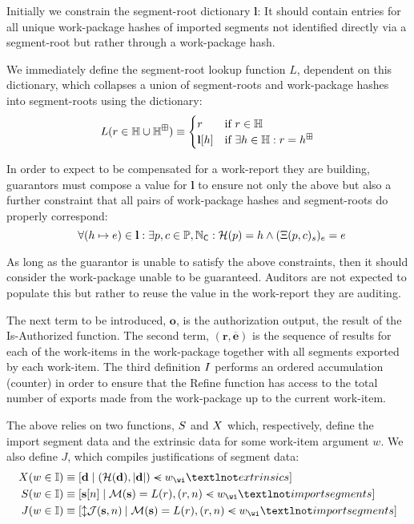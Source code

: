Initially we constrain the segment-root dictionary $\mathbf{l}$: It should contain entries for all unique work-package hashes of imported segments not identified directly via a segment-root but rather through a work-package hash.

We immediately define the segment-root lookup function $L$, dependent on this dictionary, which collapses a union of segment-roots and work-package hashes into segment-roots using the dictionary:
\begin{equation}
  L(r \in \mathbb{H}\cup\mathbb{H}^\boxplus) \equiv \begin{cases}
    r &\text{if } r \in \mathbb{H} \\
    \mathbf{l}[h] &\text{if } \exists h \in \mathbb{H}: r = h^\boxplus
  \end{cases}
\end{equation}

In order to expect to be compensated for a work-report they are building, guarantors must compose a value for $\mathbf{l}$ to ensure not only the above but also a further constraint that all pairs of work-package hashes and segment-roots do properly correspond:
\begin{equation}
  \forall (h \mapsto e) \in \mathbf{l} : \exists p, c \in \mathbb{P}, \mathbb{N}_\mathsf{C} : \mathcal{H}(p) = h \wedge (\Xi(p, c)_s)_e = e\!\!\!\!
\end{equation}

As long as the guarantor is unable to satisfy the above constraints, then it should consider the work-package unable to be guaranteed. Auditors are not expected to populate this but rather to reuse the value in the work-report they are auditing.

The next term to be introduced, $\mathbf{o}$, is the authorization output, the result of the Is-Authorized function. The second term, $(\mathbf{r}, \overline{\mathbf{e}})$ is the sequence of results for each of the work-items in the work-package together with all segments exported by each work-item. The third definition $I$ performs an ordered accumulation (\ie counter) in order to ensure that the Refine function has access to the total number of exports made from the work-package up to the current work-item.

The above relies on two functions, $S$ and $X$ which, respectively, define the import segment data and the extrinsic data for some work-item argument $w$. We also define $J$, which compiles justifications of segment data:
\begin{equation}
  \begin{aligned}
    \extrinsicdata(\wiX \in \mathbb{I}) &\equiv [\mathbf{d} \mid (\mathcal{H}(\mathbf{d}), |\mathbf{d}|) \orderedin \wiX_\wi¬extrinsics] \\
    \importsegmentdata(\wiX \in \mathbb{I}) &\equiv [\mathbf{s}[n] \mid \mathcal{M}(\mathbf{s}) = L(r), (r, n) \orderedin \wiX_\wi¬importsegments] \\
    \justifysegmentdata(\wiX \in \mathbb{I}) &\equiv [\var{\mathcal{J}(\mathbf{s}, n)} \mid \mathcal{M}(\mathbf{s}) = L(r), (r, n) \orderedin \wiX_\wi¬importsegments]
  \end{aligned}
\end{equation}

